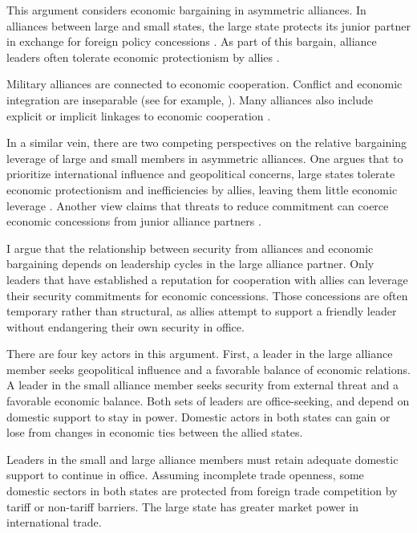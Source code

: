 \documentclass[12pt]{article}
\begin{document}
This argument considers economic bargaining in asymmetric alliances. 
In alliances between large and small states, the large state protects its junior partner in exchange for foreign policy concessions \citep{Morrow1991}.
As part of this bargain, alliance leaders often tolerate economic protectionism by allies \citep{Mastanduno1998, WolfordKim2017}. 


Military alliances are connected to economic cooperation.
Conflict and economic integration are inseparable (see for example, \citep{GartzkeLi2003, Chen2021}).
Many alliances also include explicit or implicit linkages to economic cooperation \citep{LongLeeds2006, Davis2008, Poast2012}. 


In a similar vein, there are two competing perspectives on the relative bargaining leverage of large and small members in asymmetric alliances.
One argues that to prioritize international influence and geopolitical concerns, large states tolerate economic protectionism and inefficiencies by allies, leaving them little economic leverage \citep{Drezner2013, WolfordKim2017}. 
Another view claims that threats to reduce commitment can coerce economic concessions from junior alliance partners \citep{Oatley2015}.  


I argue that the relationship between security from alliances and economic bargaining depends on leadership cycles in the large alliance partner.  
Only leaders that have established a reputation for cooperation with allies can leverage their security commitments for economic concessions. 
Those concessions are often temporary rather than structural, as allies attempt to support a friendly leader without endangering their own security in office. 


There are four key actors in this argument. 
First, a leader in the large alliance member seeks geopolitical influence and a favorable balance of economic relations. 
A leader in the small alliance member seeks security from external threat and a favorable economic balance.
Both sets of leaders are office-seeking, and depend on domestic support to stay in power.
Domestic actors in both states can gain or lose from changes in economic ties between the allied states. 


Leaders in the small and large alliance members must retain adequate domestic support to continue in office. 
Assuming incomplete trade openness, some domestic sectors in both states are protected from foreign trade competition by tariff or non-tariff barriers. 
The large state has greater market power in international trade. 
\end{document}
